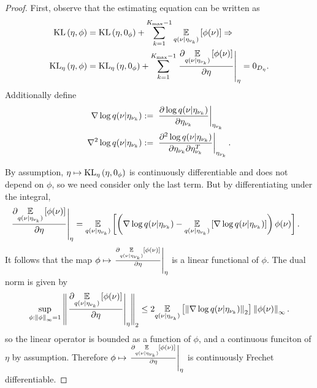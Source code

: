 \begin{thm}
\begin{proof}
First, observe that the estimating equation can be written as
%
\begin{align*}
%
\KL{\eta, \phi} ={}&
    \KL{\eta, \phiz} + \sumkm \expect{\q(\nu \vert \etanuk)}{\phi(\nu)}
    \Rightarrow \\
%
\KLgrad{\eta, \phi} ={}&
\KLgrad{\eta, \phiz} +
    \sumkm \fracat{\partial \expect{\q(\nu \vert \etanuk)}
                  {\phi(\nu)}}{\partial \eta}{\eta}
= 0_\etadim.
%
\end{align*}
%
Additionally define
%
\begin{align*}
%
\nabla \log \q(\nu \vert \etanuk) :={}&
    \fracat{\partial \log \q(\nu \vert \etanuk)}{\partial \etanuk}{\etanuk} \\
\nabla^2 \log \q(\nu \vert \etanuk) :={}&
    \fracat{\partial^2 \log \q(\nu \vert \etanuk)}
           {\partial \etanuk \partial \etanuk^T}{\etanuk}.
%
\end{align*}

By assumption, $\eta \mapsto \mathrm{KL}_{\eta}\left(\eta, 0_\phi\right)$ is continuously
differentiable and does not depend on $\phi$, so we need consider only the
last term.  But by differentiating under the integral,
%
\begin{align*}
%
\fracat{\partial \expect{\q(\nu \vert \etanuk)}
              {\phi(\nu)}}{\partial \eta}{\eta} ={}&
\expect{\q(\nu \vert \etanuk)}
       {\left(\nabla \log \q(\nu \vert \etanuk)
         - \expect{\q(\nu \vert \etanuk)}
                  {\nabla \log \q(\nu \vert \etanuk)}
       \right)\phi(\nu)}.
%
\end{align*}
%
It follows that the map $\phi \mapsto \left.\frac{\partial \underset{q(\nu \vert
\eta_{\nu_{k}})}{\mathbb{E}}\left[\phi(\nu)\right]}{\partial \eta}\right\vert_{\eta}$ is a linear functional of
$\phi$.  The dual norm is given by
%
\begin{align*}
%
\sup_{\phi: \norminf{\phi} = 1}
    \norm{\fracat{\partial \expect{\q(\nu \vert
    \etanuk)} {\phi(\nu)}}{\partial \eta}{\eta}}_2 \le
    2 \expect{\q(\nu \vert \etanuk)}
             {\norm{\nabla \log \q(\nu \vert \etanuk)}_2}
              \norminf{\phi(\nu)}.
%
\end{align*}
%
so the linear operator is bounded as a function of $\phi$, and a continuous
funciton of $\eta$ by assumption.  Therefore $\phi \mapsto \left.\frac{\partial
\underset{q(\nu \vert \eta_{\nu_{k}})}{\mathbb{E}}\left[\phi(\nu)\right]}{\partial \eta}\right\vert_{\eta}$ is
continuously Frechet differentiable.


\end{proof}
\end{thm}
